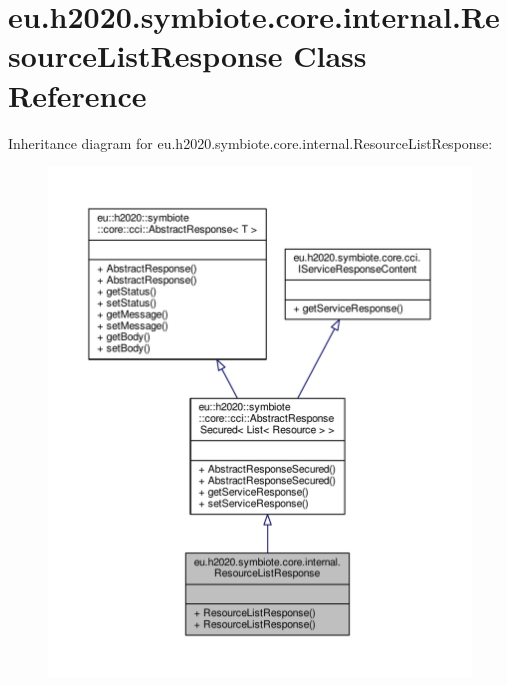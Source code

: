 \hypertarget{classeu_1_1h2020_1_1symbiote_1_1core_1_1internal_1_1ResourceListResponse}{}\section{eu.\+h2020.\+symbiote.\+core.\+internal.\+Resource\+List\+Response Class Reference}
\label{classeu_1_1h2020_1_1symbiote_1_1core_1_1internal_1_1ResourceListResponse}


Inheritance diagram for eu.\+h2020.\+symbiote.\+core.\+internal.\+Resource\+List\+Response\+:
\nopagebreak
\begin{figure}[H]
\begin{center}
\leavevmode
\includegraphics[width=350pt]{classeu_1_1h2020_1_1symbiote_1_1core_1_1internal_1_1ResourceListResponse__inherit__graph}
\end{center}
\end{figure}


